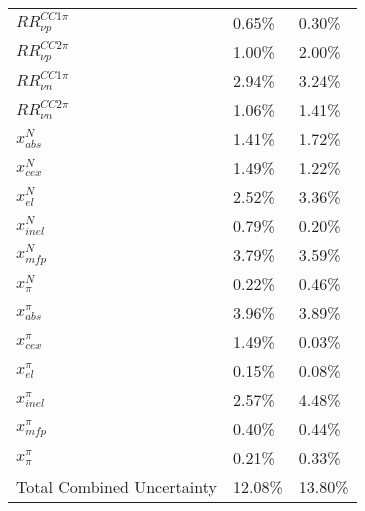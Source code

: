 \documentclass{article}
\begin{document}
\begin{table*}
\begin{tabular}{| l | l | l |}
$RR_{\nu p}^{CC1\pi}$ & 0.65\% & 0.30\% \\ 
$RR_{\nu p}^{CC2\pi}$ & 1.00\% & 2.00\% \\
$RR_{\nu n}^{CC1\pi}$ & 2.94\% & 3.24\% \\ 
$RR_{\nu n}^{CC2\pi}$ & 1.06\% & 1.41\% \\ \hline

$x_{abs}^{N}$ & 1.41\% & 1.72\% \\
$x_{cex}^{N}$ & 1.49\% & 1.22\%\\
$x_{el}^{N}$ & 2.52\% & 3.36\% \\
$x_{inel}^{N}$ & 0.79\% & 0.20\% \\
$x_{mfp}^{N}$ & 3.79\% & 3.59\% \\
$x_{\pi}^{N}$ & 0.22\% & 0.46\% \\
$x_{abs}^{\pi}$ & 3.96\% & 3.89\% \\
$x_{cex}^{\pi}$ & 1.49\% & 0.03\% \\
$x_{el}^{\pi}$ & 0.15\% & 0.08\% \\
$x_{inel}^{\pi}$ & 2.57\% & 4.48\% \\
$x_{mfp}^{\pi}$ & 0.40\% & 0.44\% \\
$x_{\pi}^{\pi}$ & 0.21\% & 0.33\% \\
\hline
Total Combined Uncertainty & 12.08\% & 13.80\% \\ \hline
\end{tabular}
\end{table*}
\end{document}
